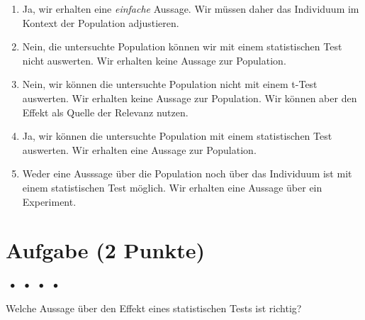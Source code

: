 \documentclass[a4paper, 9pt]{scrartcl}\usepackage[]{graphicx}\usepackage[]{xcolor}
\begin{document}
\begin{enumerate}
\item [\textbf{A} \msquare] Ja, wir erhalten eine \textit{einfache} Aussage. Wir müssen daher das Individuum im Kontext der Population adjustieren.
\item [\textbf{B} \msquare] Nein, die untersuchte Population können wir mit einem statistischen Test nicht auswerten. Wir erhalten keine Aussage zur Population.
\item [\textbf{C} \msquare] Nein, wir können die untersuchte Population nicht mit einem t-Test auswerten. Wir erhalten keine Aussage zur Population. Wir können aber den Effekt als Quelle der Relevanz nutzen.
\item [\textbf{D} \msquare] Ja, wir können die untersuchte Population mit einem statistischen Test auswerten. Wir erhalten eine Aussage zur Population.
\item [\textbf{E} \msquare] Weder eine Ausssage über die Population noch über das Individuum ist mit einem statistischen Test möglich. Wir erhalten eine Aussage über ein Experiment.
\end{enumerate}

\section{Aufgabe \hfill (2 Punkte)}

\ifcollection
\begin{flushright}
\tiny\vspace{-2Ex}
\textbf{\examinhaltstart}
\exammodulemathstat $\;\bullet$
\exammodulestat $\;\bullet$
\exammodulestatbbv $\;\bullet$
\exammodulestatversuch $\;\bullet$
\exammodulebiostat
\vspace{-1Ex}
\end{flushright}
\fi




Welche Aussage über den Effekt eines statistischen Tests ist richtig?
\end{document}
